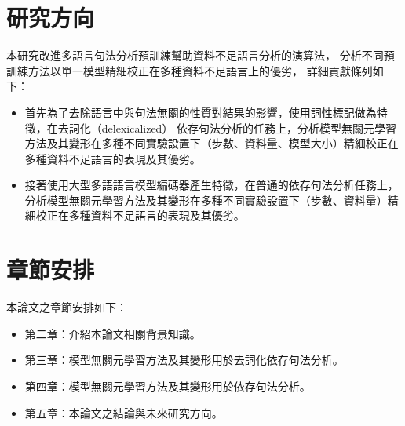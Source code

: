 \section{研究方向}
本研究改進多語言句法分析預訓練幫助資料不足語言分析的演算法，
分析不同預訓練方法以單一模型精細校正在多種資料不足語言上的優劣，
詳細貢獻條列如下：
\begin{itemize}
  \item 首先為了去除語言中與句法無關的性質對結果的影響，使用詞性標記做為特徵，在去詞化（delexicalized）
  依存句法分析的任務上，分析模型無關元學習方法及其變形在多種不同實驗設置下（步數、資料量、模型大小）精細校正在多種資料不足語言的表現及其優劣。
  \item 接著使用大型多語語言模型編碼器產生特徵，在普通的依存句法分析任務上，
分析模型無關元學習方法及其變形在多種不同實驗設置下（步數、資料量）精細校正在多種資料不足語言的表現及其優劣。
\end{itemize}


\section{章節安排}
本論文之章節安排如下：

\begin{itemize}
\itemsep -2pt %
  \item  第二章：介紹本論文相關背景知識。
  \item  第三章：模型無關元學習方法及其變形用於去詞化依存句法分析。
  \item  第四章：模型無關元學習方法及其變形用於依存句法分析。
  \item  第五章：本論文之結論與未來研究方向。
\end{itemize}

